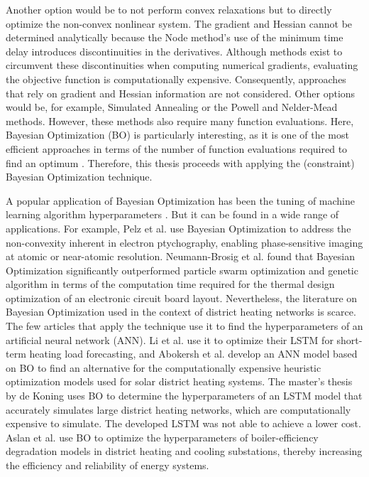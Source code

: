 Another option would be to not perform convex relaxations but to directly optimize the non-convex nonlinear system. The gradient and Hessian cannot be determined analytically because the Node method's use of the minimum time delay introduces discontinuities in the derivatives. Although methods exist to circumvent these discontinuities when computing numerical gradients, evaluating the objective function is computationally expensive. Consequently, approaches that rely on gradient and Hessian information are not considered. Other options would be, for example, Simulated Annealing or the Powell and Nelder-Mead methods. However, these methods also require many function evaluations. Here, Bayesian Optimization (BO) is particularly interesting, as it is one of the most efficient approaches in terms of the number of function evaluations required to find an optimum \cite{bo_tutorial}. Therefore, this thesis proceeds with applying the (constraint) Bayesian Optimization technique. 

A popular application of Bayesian Optimization has been the tuning of machine learning algorithm hyperparameters \cite{gardner2014bayesian}. But it can be found in a wide range of applications. For example, Pelz et al. \cite{Pelz} use Bayesian Optimization to address the non-convexity inherent in electron ptychography, enabling phase-sensitive imaging at atomic or near-atomic resolution. Neumann-Brosig et al. \cite{thermalNetworkBO} found that Bayesian Optimization significantly outperformed particle swarm optimization and genetic algorithm in terms of the computation time required for the thermal design optimization of an electronic circuit board layout. Nevertheless, the literature on Bayesian Optimization used in the context of district heating networks is scarce. The few articles that apply the technique use it to find the hyperparameters of an artificial neural network (ANN). Li et al. \cite{LIbayesian} use it to optimize their LSTM for short-term heating load forecasting, and Abokersh et al. \cite{ABOKERSH2020403} develop an ANN model based on BO to find an alternative for the computationally expensive heuristic optimization models used for solar district heating systems. The master's thesis by de Koning \cite{deKoning2020} uses BO to determine the hyperparameters of an LSTM model that accurately simulates large district heating networks, which are computationally expensive to simulate. The developed LSTM was not able to achieve a lower cost. Aslan et al. \cite{Aslan06062025} use BO to optimize the hyperparameters of boiler-efficiency degradation models in district heating and cooling substations, thereby increasing the efficiency and reliability of energy systems.

